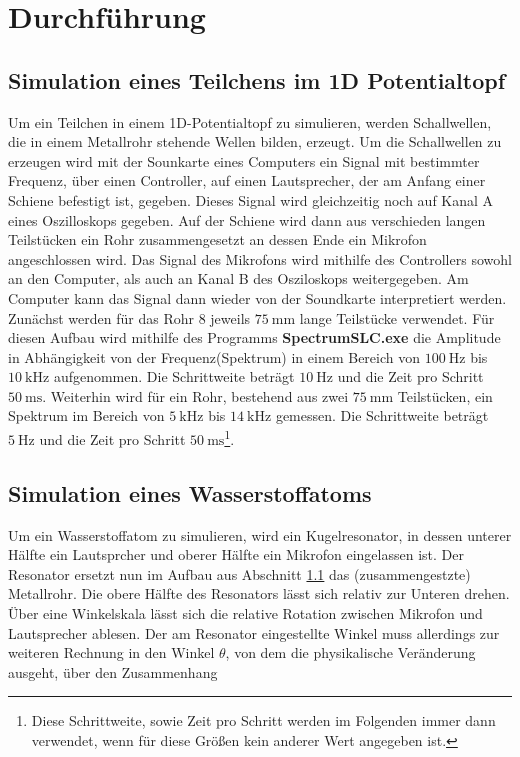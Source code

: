 \section{Durchführung}
\label{sec:Durchführung}

\subsection{Simulation eines Teilchens im 1D Potentialtopf}
\label{subsec:ch1}
Um ein Teilchen in einem 1D-Potentialtopf zu simulieren,
werden Schallwellen, die in einem Metallrohr stehende Wellen
bilden, erzeugt. Um die Schallwellen zu erzeugen wird
mit der Sounkarte eines Computers ein Signal mit bestimmter
Frequenz, über einen Controller, auf einen Lautsprecher, der am Anfang einer Schiene
befestigt ist, gegeben. Dieses Signal wird gleichzeitig noch auf Kanal A eines Oszilloskops gegeben.
Auf der Schiene wird dann aus verschieden langen Teilstücken
ein Rohr zusammengesetzt an dessen Ende ein Mikrofon
angeschlossen wird. Das Signal des Mikrofons wird mithilfe des Controllers
sowohl an den Computer, als auch an Kanal B des Osziloskops weitergegeben.
Am Computer kann das Signal dann wieder von der Soundkarte interpretiert werden.\\
Zunächst werden für das Rohr $8$ jeweils $\SI{75}{\milli\meter}$
lange Teilstücke verwendet. Für diesen Aufbau wird mithilfe des
Programms \textbf{SpectrumSLC.exe} die Amplitude in Abhängigkeit
von der Frequenz(Spektrum) in einem Bereich von $\SI{100}{\hertz}$ bis
$\SI{10}{\kilo\hertz}$ aufgenommen. Die Schrittweite beträgt
$\SI{10}{\hertz}$ und die Zeit pro Schritt
$\SI{50}{\milli\second}$.
Weiterhin wird für ein Rohr, bestehend aus zwei
$\SI{75}{\milli\meter}$ Teilstücken, ein Spektrum im Bereich
von $\SI{5}{\kilo\hertz}$ bis $\SI{14}{\kilo\hertz}$ gemessen.
Die Schrittweite beträgt $\SI{5}{\hertz}$ und die Zeit pro Schritt
$\SI{50}{\milli\second}$\footnote{Diese Schrittweite, sowie Zeit pro Schritt werden im
Folgenden immer dann verwendet, wenn für diese Größen
kein anderer Wert angegeben ist.}.



\subsection{Simulation eines Wasserstoffatoms}
\label{subsec:ch2}
Um ein Wasserstoffatom zu simulieren, wird ein
Kugelresonator, in dessen unterer Hälfte ein Lautsprcher
und oberer Hälfte ein Mikrofon eingelassen ist.
Der Resonator ersetzt nun im Aufbau aus Abschnitt
\ref{subsec:ch1} das (zusammengestzte) Metallrohr.
Die obere Hälfte des Resonators lässt sich relativ
zur Unteren drehen. Über eine Winkelskala lässt sich
die relative Rotation zwischen Mikrofon und
Lautsprecher ablesen. Der am Resonator eingestellte Winkel
muss allerdings zur weiteren Rechnung in den Winkel $\theta$,
von dem die physikalische Veränderung ausgeht, über den Zusammenhang

